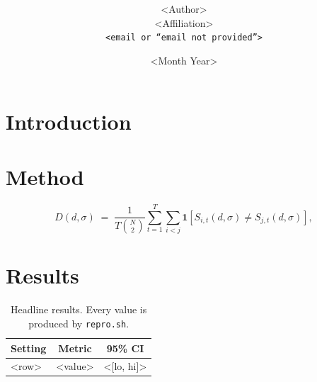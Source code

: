 \documentclass[10pt,twocolumn]{article}
\title{\bf <Paper Title>}
\author{<Author> \\ <Affiliation> \\ \texttt{<email or ``email not provided''>}}
\date{<Month Year>}
\begin{document}

\section{Introduction}

\section{Method}
\begin{equation}
  D(d,\sigma) \;=\; \frac{1}{T\binom{N}{2}} \sum_{t=1}^{T} \sum_{i<j}
  \mathbf{1}\!\left[ S_{i,t}(d,\sigma) \neq S_{j,t}(d,\sigma) \right],
  \label{eq:metric}
\end{equation}

\section{Results}
\begin{table}[t]
  \centering
  \caption{Headline results. Every value is produced by \texttt{repro.sh}.}
  \label{tab:headline}
  \small
  \begin{tabular}{lcc}
    \toprule
    Setting & Metric & 95\% CI \\
    \midrule
    <row> & <value> & <[lo, hi]> \\
    \bottomrule
  \end{tabular}
\end{table}
\end{document}

